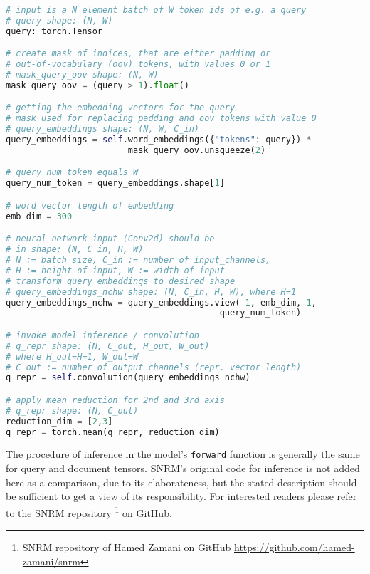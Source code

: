 \begin{lstlisting}[language=Python,frame=single,breaklines=true,float=tbh,caption=Part of SNRM's \texttt{forward} function for model inference resp. representation generation for a query batch in the PyTorch implementation,label=query-model-forward-pytorch]
# input is a N element batch of W token ids of e.g. a query
# query shape: (N, W)
query: torch.Tensor

# create mask of indices, that are either padding or 
# out-of-vocabulary (oov) tokens, with values 0 or 1
# mask_query_oov shape: (N, W)
mask_query_oov = (query > 1).float() 

# getting the embedding vectors for the query
# mask used for replacing padding and oov tokens with value 0
# query_embeddings shape: (N, W, C_in)
query_embeddings = self.word_embeddings({"tokens": query}) * 
                        mask_query_oov.unsqueeze(2) 

# query_num_token equals W
query_num_token = query_embeddings.shape[1]

# word vector length of embedding
emb_dim = 300

# neural network input (Conv2d) should be 
# in shape: (N, C_in, H, W)
# N := batch size, C_in := number of input_channels,    
# H := height of input, W := width of input
# transform query_embeddings to desired shape
# query_embeddings_nchw shape: (N, C_in, H, W), where H=1
query_embeddings_nchw = query_embeddings.view(-1, emb_dim, 1, 
                                          query_num_token)

# invoke model inference / convolution
# q_repr shape: (N, C_out, H_out, W_out)
# where H_out=H=1, W_out=W
# C_out := number of output_channels (repr. vector length)
q_repr = self.convolution(query_embeddings_nchw)

# apply mean reduction for 2nd and 3rd axis
# q_repr shape: (N, C_out)
reduction_dim = [2,3]
q_repr = torch.mean(q_repr, reduction_dim)
\end{lstlisting}

The procedure of inference in the model's \texttt{forward} function is generally
    the same for query and document tensors.
SNRM's original code for inference is not added here as a comparison, due to its 
    elaborateness, but the stated description should be sufficient
    to get a view of its responsibility.
For interested readers please refer to the SNRM repository
    \footnote{SNRM repository of Hamed Zamani on GitHub \url{https://github.com/hamed-zamani/snrm}}
    on GitHub.

